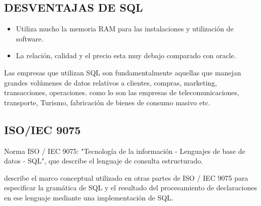 \documentclass[preprint,12pt]{elsarticle}
\begin{document}
\subsection{DESVENTAJAS DE SQL}	

\begin{itemize}

\item Utiliza mucho la memoria RAM  para las instalaciones y utilización de software.
\item La relación, calidad y el precio esta muy debajo comparado con oracle.
\end{itemize}
Las empresas que utilizan SQL son fundamentalmente aquellas que manejan grandes volúmenes de datos relativos a clientes, compras, marketing, transacciones, operaciones. como lo son las empresas de telecomunicaciones, transporte, Turismo, fabricación de bienes de consumo masivo etc.

\subsection{ISO/IEC 9075}

Norma ISO / IEC 9075: "Tecnología de la información - Lenguajes de base de datos - SQL", que describe el lenguaje de consulta estructurado.

describe el marco conceptual utilizado en otras partes de ISO / IEC 9075 para especificar la gramática de SQL y el resultado del procesamiento de declaraciones en ese lenguaje mediante una implementación de SQL.


	




\end{document}
